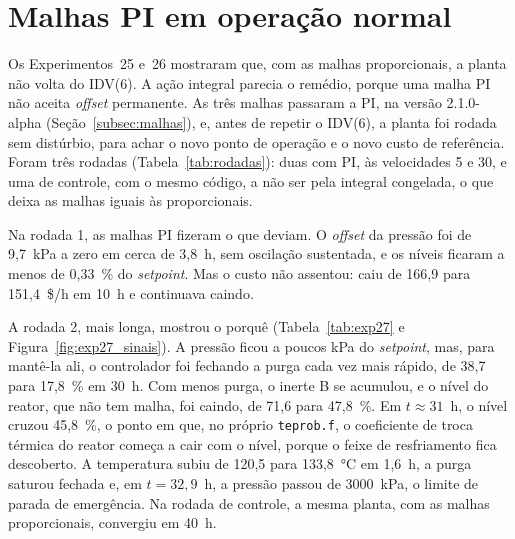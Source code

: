 \FloatBarrier
\section{Malhas PI em operação normal}
\label{sec:sup_pi}

Os Experimentos~25 e~26 mostraram que, com as malhas proporcionais, a planta não volta do IDV(6). A ação integral parecia o remédio, porque uma malha PI não aceita \textit{offset} permanente. As três malhas passaram a PI, na versão 2.1.0-alpha (Seção~\ref{subsec:malhas}), e, antes de repetir o IDV(6), a planta foi rodada sem distúrbio, para achar o novo ponto de operação e o novo custo de referência. Foram três rodadas (Tabela~\ref{tab:rodadas}): duas com PI, às velocidades 5 e 30, e uma de controle, com o mesmo código, a não ser pela integral congelada, o que deixa as malhas iguais às proporcionais.

Na rodada 1, as malhas PI fizeram o que deviam. O \textit{offset} da pressão foi de 9,7~kPa a zero em cerca de 3,8~h, sem oscilação sustentada, e os níveis ficaram a menos de 0,33~\% do \textit{setpoint}. Mas o custo não assentou: caiu de 166,9 para 151,4~\$/h em 10~h e continuava caindo.

A rodada 2, mais longa, mostrou o porquê (Tabela~\ref{tab:exp27} e Figura~\ref{fig:exp27_sinais}). A pressão ficou a poucos kPa do \textit{setpoint}, mas, para mantê-la ali, o controlador foi fechando a purga cada vez mais rápido, de 38,7 para 17,8~\% em 30~h. Com menos purga, o inerte B se acumulou, e o nível do reator, que não tem malha, foi caindo, de 71,6 para 47,8~\%. Em $t \approx 31$~h, o nível cruzou 45,8~\%, o ponto em que, no próprio \texttt{teprob.f}, o coeficiente de troca térmica do reator começa a cair com o nível, porque o feixe de resfriamento fica descoberto. A temperatura subiu de 120,5 para 133,8~°C em 1,6~h, a purga saturou fechada e, em $t = 32{,}9$~h, a pressão passou de 3000~kPa, o limite de parada de emergência. Na rodada de controle, a mesma planta, com as malhas proporcionais, convergiu em 40~h.

